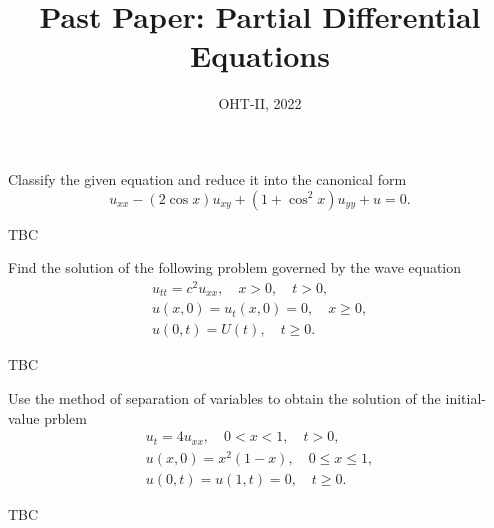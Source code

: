 \documentclass[11pt]{penrose}
\title{Past Paper: Partial Differential Equations}
\subtitle{OHT-II, 2022}
\begin{document}
\maketitle
\warningtext

\begin{problem}{1}
    Classify the given equation and reduce it into the canonical form
    \begin{equation*}
        u_{xx} - (2 \cos x) u_{xy} + (1 + \cos^2 x) u_{yy} + u = 0.
    \end{equation*}
    
    \solution TBC
\end{problem}

\begin{problem}{2}
    Find the solution of the following problem governed by the wave equation
    \begin{gather*}
        u_{tt} = c^2 u_{xx}, \quad x > 0, \quad t > 0,\\
        u(x,0) = u_{t}(x,0) = 0, \quad x \geq 0,\\
        u(0,t) = U(t), \quad t \geq 0.
    \end{gather*}
    
    \solution TBC
\end{problem}

\begin{problem}{3}
    Use the method of separation of variables to obtain the solution of the initial-value prblem
    \begin{gather*}
        u_{t} = 4 u_{xx}, \quad 0 < x < 1, \quad t > 0,\\
        u(x,0) = x^2 (1-x), \quad 0 \leq x \leq 1,\\
        u(0,t) = u(1,t) = 0, \quad t \geq 0.
    \end{gather*}
    
    \solution TBC
\end{problem}
\end{document}
